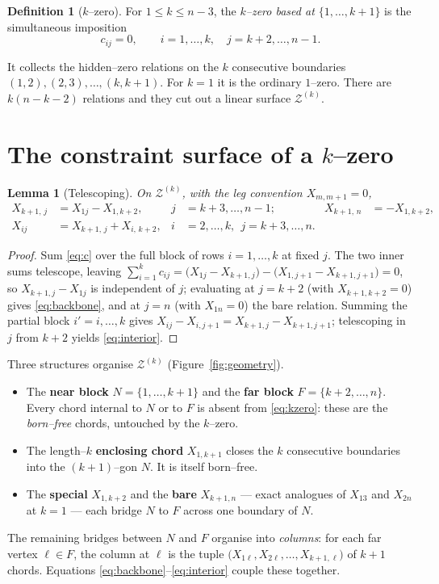 \documentclass[11pt]{article}
\newtheorem{lemma}{Lemma}
\theoremstyle{definition}
\newtheorem{definition}{Definition}
\newcommand{\Z}{\mathcal{Z}}
\newcommand{\X}[1]{X_{#1}}
\begin{document}
\begin{definition}[$k$--zero]\label{def:kzero}
For $1\le k\le n-3$, the \emph{$k$--zero based at $\{1,\dots,k{+}1\}$} is the simultaneous imposition
\begin{equation}\label{eq:kzero}
  c_{ij}=0,\qquad i=1,\dots,k,\quad j=k+2,\dots,n-1 .
\end{equation}
\end{definition}
\noindent It collects the hidden--zero relations on the $k$ consecutive boundaries
$(1,2),(2,3),\dots,(k,k{+}1)$. For $k=1$ it is the ordinary $1$--zero. There are $k(n-k-2)$ relations
and they cut out a linear surface $\Z^{(k)}$.

\section{The constraint surface of a $k$--zero}
\begin{lemma}[Telescoping]\label{lem:tele}
On $\Z^{(k)}$, with the leg convention $\X{m,m+1}=0$,
\begin{align}
  \X{k+1,\,j} &= \X{1j}-\X{1,k+2}, & j&=k+3,\dots,n-1; & \X{k+1,\,n}&=-\X{1,k+2},\label{eq:backbone}\\
  \X{ij} &= \X{k+1,\,j}+\X{i,\,k+2}, & i&=2,\dots,k,\ \ j=k+3,\dots,n.\label{eq:interior}
\end{align}
\end{lemma}
\begin{proof}
Sum \eqref{eq:c} over the full block of rows $i=1,\dots,k$ at fixed $j$. The two inner sums
telescope, leaving $\sum_{i=1}^{k}c_{ij}=\bigl(\X{1j}-\X{k+1,j}\bigr)-\bigl(\X{1,j+1}-\X{k+1,j+1}\bigr)=0$,
so $\X{k+1,j}-\X{1j}$ is independent of $j$; evaluating at $j=k+2$ (with $\X{k+1,k+2}=0$) gives
\eqref{eq:backbone}, and at $j=n$ (with $\X{1n}=0$) the bare relation. Summing the partial block
$i'=i,\dots,k$ gives $\X{ij}-\X{i,j+1}=\X{k+1,j}-\X{k+1,j+1}$; telescoping in $j$ from $k+2$ yields
\eqref{eq:interior}.
\end{proof}

\noindent Three structures organise $\Z^{(k)}$ (Figure~\ref{fig:geometry}).
\begin{itemize}[topsep=2pt,itemsep=1pt]
  \item The \textbf{near block} $N=\{1,\dots,k{+}1\}$ and the \textbf{far block}
  $F=\{k{+}2,\dots,n\}$. Every chord internal to $N$ or to $F$ is absent from \eqref{eq:kzero}:
  these are the \emph{born--free} chords, untouched by the $k$--zero.
  \item The length--$k$ \textbf{enclosing chord} $\X{1,k+1}$ closes the $k$ consecutive boundaries
  into the $(k{+}1)$--gon $N$. It is itself born--free.
  \item The \textbf{special} $\X{1,k+2}$ and the \textbf{bare} $\X{k+1,n}$ --- exact analogues of
  $\X{13}$ and $\X{2n}$ at $k=1$ --- each bridge $N$ to $F$ across one boundary of $N$.
\end{itemize}
The remaining bridges between $N$ and $F$ organise into \emph{columns}: for each far vertex
$\ell\in F$, the column at $\ell$ is the tuple
$\bigl(\X{1\ell},\X{2\ell},\dots,\X{k+1,\ell}\bigr)$ of $k{+}1$ chords. Equations
\eqref{eq:backbone}--\eqref{eq:interior} couple these together.
\end{document}
